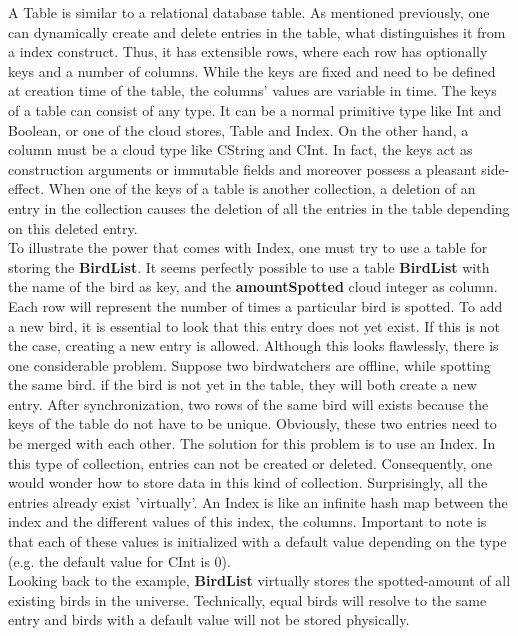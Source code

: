 \documentclass[a4paper,12pt]{report}
\begin{document}
A \textcolor{codeblue}{Table} is similar to a relational database table. As mentioned previously, one can dynamically create and delete entries in the table, what distinguishes it from a index construct. Thus, it has extensible rows, where each row has optionally keys and a number of columns. While the keys are fixed and need to be defined at creation time of the table, the columns' values are variable in time. The keys of a table can consist of any type. It can be a normal primitive type like \textcolor{codedarkblue}{Int} and \textcolor{codedarkblue}{Boolean}, or one of the cloud stores, \textcolor{codeblue}{Table} and \textcolor{codeblue}{Index}. On the other hand, a column must be a cloud type like \textcolor{codedarkblue}{CString} and \textcolor{codedarkblue}{CInt}. In fact, the keys act as construction arguments or immutable fields and moreover possess a pleasant side-effect. When one of the keys of a table is another collection, a deletion of an entry in the collection causes the deletion of all the entries in the table depending on this deleted entry. \\

To illustrate the power that comes with \textcolor{codeblue}{Index}, one must try to use a table for storing the \textbf{BirdList}. It seems perfectly possible to use a table \textbf{BirdList} with the name of the bird as key, and the \textbf{amountSpotted} cloud integer as column. Each row will represent the number of times a particular bird is spotted. To add a new bird, it is essential to look that this entry does not yet exist. If this is not the case, creating a new entry is allowed. Although this looks flawlessly, there is one considerable problem. Suppose two birdwatchers are offline, while spotting the same bird. if the bird is not yet in the table, they will both create a new entry. After synchronization, two rows of the same bird will exists because the keys of the table do not have to be unique. Obviously, these two entries need to be merged with each other. The solution for this problem is to use an \textcolor{codeblue}{Index}. In this type of collection, entries can not be created or deleted. Consequently, one would wonder how to store data in this kind of collection. Surprisingly, all the entries already exist 'virtually'. An \textcolor{codeblue}{Index} is like an infinite hash map between the index and the different values of this index, the columns. Important to note is that each of these values is initialized with a default value depending on the type (e.g. the default value for \textcolor{codedarkblue}{CInt} is 0). \\
Looking back to the example, \textbf{BirdList} virtually stores the spotted-amount of all existing birds in the universe. Technically, equal birds will resolve to the same entry and birds with a default value will not be stored physically. \\
\end{document}
